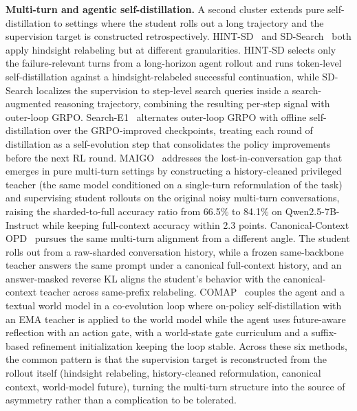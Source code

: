 \documentclass{article} %
\begin{document}
\textbf{Multi-turn and agentic self-distillation.} A second cluster extends pure self-distillation to settings where the student rolls out a long trajectory and the supervision target is constructed retrospectively. HINT-SD~\citep{2605.17873} and SD-Search~\citep{2605.18299} both apply hindsight relabeling but at different granularities. HINT-SD selects only the failure-relevant turns from a long-horizon agent rollout and runs token-level self-distillation against a hindsight-relabeled successful continuation, while SD-Search localizes the supervision to step-level search queries inside a search-augmented reasoning trajectory, combining the resulting per-step signal with outer-loop GRPO. Search-E1~\citep{2605.22511} alternates outer-loop GRPO with offline self-distillation over the GRPO-improved checkpoints, treating each round of distillation as a self-evolution step that consolidates the policy improvements before the next RL round. MAIGO~\citep{2605.27186} addresses the lost-in-conversation gap that emerges in pure multi-turn settings by constructing a history-cleaned privileged teacher (the same model conditioned on a single-turn reformulation of the task) and supervising student rollouts on the original noisy multi-turn conversations, raising the sharded-to-full accuracy ratio from 66.5\% to 84.1\% on Qwen2.5-7B-Instruct while keeping full-context accuracy within 2.3 points. Canonical-Context OPD~\citep{2605.30251} pursues the same multi-turn alignment from a different angle. The student rolls out from a raw-sharded conversation history, while a frozen same-backbone teacher answers the same prompt under a canonical full-context history, and an answer-masked reverse KL aligns the student's behavior with the canonical-context teacher across same-prefix relabeling. COMAP~\citep{2606.02372} couples the agent and a textual world model in a co-evolution loop where on-policy self-distillation with an EMA teacher is applied to the world model while the agent uses future-aware reflection with an action gate, with a world-state gate curriculum and a suffix-based refinement initialization keeping the loop stable. Across these six methods, the common pattern is that the supervision target is reconstructed from the rollout itself (hindsight relabeling, history-cleaned reformulation, canonical context, world-model future), turning the multi-turn structure into the source of asymmetry rather than a complication to be tolerated.
\end{document}
